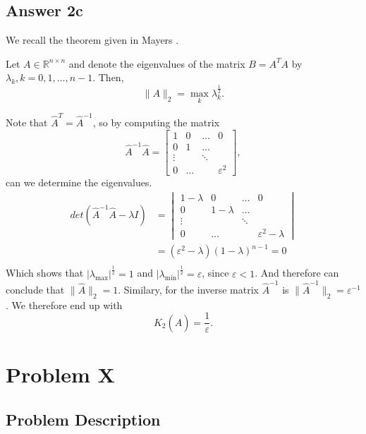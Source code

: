 \documentclass{article}
\theoremstyle{remark}
\begin{document}
\subsection{Answer 2c}%
\label{sub:answer_c}
 We recall the theorem given in Mayers \cite{sul}. 
\begin{theorem}
  Let $ A \in  \mathbb{R} ^{n \times n }$ and denote the eigenvalues of the matrix $B = A^{T} A$ by $\lambda _{k}, k = 0,1,\ldots,n-1$. Then, \[
    \|A\|_{2}^{} = \max_{k }  \lambda _{k} ^{\frac{1}{2}}.
  \] 
\end{theorem}
Note that $\hat{A}^{T} = \hat{A}^{-1}$, so by computing the matrix \[
\hat{A}^{-1} \hat{A} = \begin{bmatrix} 
1  & 0  &  \ldots  &  0 \\
0   &  1  &  \ldots  \\
\vdots   &   &  \ddots   &  \\
0  &  \ldots  &   &   \varepsilon ^{2} 
\end{bmatrix} ,
\] 
 can we determine the eigenvalues.\[
   \begin{split}
det \left(  \hat{A}^{-1} \hat{A} - \lambda I \right)  &= 
\begin{vmatrix} 
1- \lambda   & 0  &  \ldots  &  0 \\
0   &  1 - \lambda   &  \ldots  \\
\vdots   &   &  \ddots   &  \\
0  &  \ldots  &   &   \varepsilon ^2  - \lambda  
\end{vmatrix}  \\
   &=  \left( \varepsilon ^2 - \lambda  \right) \left( 1- \lambda  \right)^{n-1} = 0 \\
   \end{split}  
 \] 
 Which shows that $\left\lvert \lambda_{\text{max}}  \right\rvert^{\frac{1}{2}}   = 1  $ and $\left\lvert \lambda_{\text{min}}  \right\rvert^{\frac{1}{2}}   = \varepsilon   $, since $\varepsilon   < 1$. And therefore can conclude that $\|\hat{A}\|_{2}^{} = 1 $. Similary, for the inverse matrix $\hat{A}^{-1}$ is $\|\hat{A}^{-1}\|_{2}^{} = \varepsilon ^{-1} $. 
 We therefore end up with \[
 K_{2}\left( \hat{A} \right) = \frac{1}{\varepsilon } .
 \] 

 \newpage
 \section{Problem X}%
 \label{sec:problem_x}
 \subsection{Problem Description}%
 \label{sub:problem_description}
 
\end{document}
